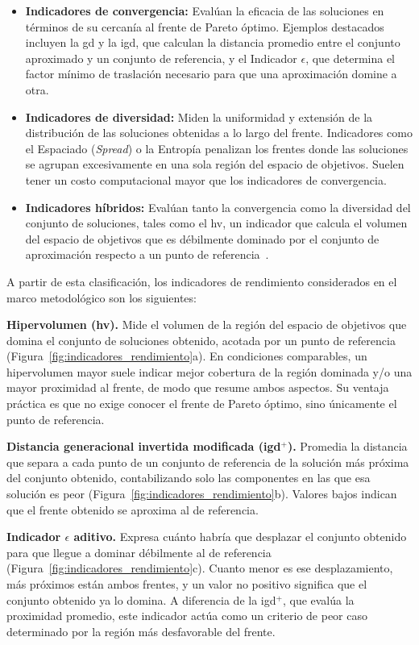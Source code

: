 \begin{itemize}
    \item \textbf{Indicadores de convergencia:} Evalúan la eficacia de las soluciones en términos de su cercanía al frente de Pareto óptimo. Ejemplos destacados incluyen la \gls{gd} y la \gls{igd}, que calculan la distancia promedio entre el conjunto aproximado y un conjunto de referencia, y el Indicador $\epsilon$, que determina el factor mínimo de traslación necesario para que una aproximación domine a otra.
    \item \textbf{Indicadores de diversidad:} Miden la uniformidad y extensión de la distribución de las soluciones obtenidas a lo largo del frente. Indicadores como el Espaciado (\textit{Spread}) o la Entropía penalizan los frentes donde las soluciones se agrupan excesivamente en una sola región del espacio de objetivos. Suelen tener un costo computacional mayor que los indicadores de convergencia.
    \item \textbf{Indicadores híbridos:} Evalúan tanto la convergencia como la diversidad del conjunto de soluciones, tales como el \gls{hv}, un indicador que calcula el volumen del espacio de objetivos que es débilmente dominado por el conjunto de aproximación respecto a un punto de referencia~\cite{talbi2009metaheuristics}.
\end{itemize}

A partir de esta clasificación, los indicadores de rendimiento considerados en el marco metodológico son los siguientes:

\textbf{Hipervolumen (\acrshort{hv}).} Mide el volumen de la región del espacio de objetivos que domina el conjunto de soluciones obtenido, acotada por un punto de referencia (Figura~\ref{fig:indicadores_rendimiento}a). En condiciones comparables, un hipervolumen mayor suele indicar mejor cobertura de la región dominada y/o una mayor proximidad al frente, de modo que resume ambos aspectos. Su ventaja práctica es que no exige conocer el frente de Pareto óptimo, sino únicamente el punto de referencia.

\textbf{Distancia generacional invertida modificada (\acrshort{igd}$^+$).} Promedia la distancia que separa a cada punto de un conjunto de referencia de la solución más próxima del conjunto obtenido, contabilizando solo las componentes en las que esa solución es peor (Figura~\ref{fig:indicadores_rendimiento}b). Valores bajos indican que el frente obtenido se aproxima al de referencia.

\textbf{Indicador $\epsilon$ aditivo.} Expresa cuánto habría que desplazar el conjunto obtenido para que llegue a dominar débilmente al de referencia (Figura~\ref{fig:indicadores_rendimiento}c). Cuanto menor es ese desplazamiento, más próximos están ambos frentes, y un valor no positivo significa que el conjunto obtenido ya lo domina. A diferencia de la \acrshort{igd}$^+$, que evalúa la proximidad promedio, este indicador actúa como un criterio de peor caso determinado por la región más desfavorable del frente.

